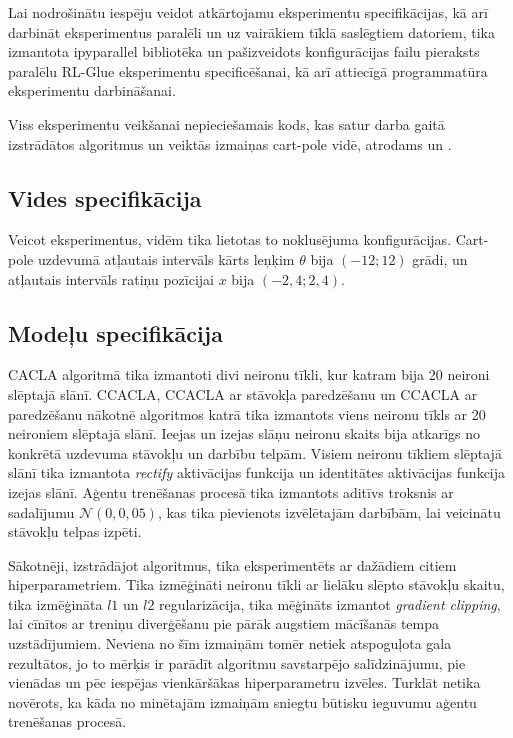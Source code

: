 \documentclass{ludis} %
\begin{document}
Lai nodrošinātu iespēju veidot atkārtojamu eksperimentu specifikācijas, kā arī
darbināt eksperimentus paralēli un uz vairākiem tīklā saslēgtiem datoriem, tika
izmantota ipyparallel bibliotēka \autocite{ipyparallel} un pašizveidots
konfigurācijas failu pieraksts paralēlu RL-Glue eksperimentu specificēšanai, kā
arī attiecīgā programmatūra eksperimentu darbināšanai.

Viss eksperimentu veikšanai nepieciešamais kods, kas satur darba gaitā
izstrādātos algoritmus un veiktās izmaiņas cart-pole vidē, atrodams
\autocite{predictiverl} un \autocite{continuousenv}.

\subsection{Vides specifikācija}
Veicot eksperimentus, vidēm tika lietotas to noklusējuma konfigurācijas.
Cart-pole uzdevumā atļautais intervāls kārts leņķim $\theta$ bija $(-12; 12)$
grādi, un atļautais intervāls ratiņu pozīcijai $x$ bija $(-2,4; 2,4)$.


\subsection{Modeļu specifikācija}
CACLA algoritmā tika izmantoti divi neironu tīkli, kur katram bija 20
neironi slēptajā slānī. CCACLA, CCACLA ar stāvokļa paredzēšanu un CCACLA ar
paredzēšanu nākotnē algoritmos katrā tika izmantots viens neironu tīkls ar 20
neironiem slēptajā slānī. Ieejas un izejas slāņu neironu skaits bija atkarīgs no
konkrētā uzdevuma stāvokļu un darbību telpām. Visiem neironu tīkliem slēptajā
slānī tika izmantota \textit{rectify} aktivācijas funkcija un identitātes
aktivācijas funkcija izejas slānī. Aģentu trenēšanas procesā tika izmantots
aditīvs troksnis ar sadalījumu $\mathcal{N}(0, 0,05)$, kas tika pievienots
izvēlētajām darbībām, lai veicinātu stāvokļu telpas izpēti.

Sākotnēji, izstrādājot algoritmus, tika eksperimentēts ar dažādiem citiem
hiperparametriem. Tika izmēģināti neironu tīkli ar lielāku slēpto stāvokļu
skaitu, tika izmēģināta $l1$ un $l2$ regularizācija, tika mēģināts izmantot
\textit{gradient clipping}, lai cīnītos ar treniņu diverģēšanu pie pārāk
augstiem mācīšanās tempa uzstādījumiem. Neviena no šīm izmaiņām tomēr netiek
atspoguļota gala rezultātos, jo to mērķis ir parādīt algoritmu savstarpējo
salīdzinājumu, pie vienādas un pēc iespējas vienkāršākas hiperparametru izvēles.
Turklāt netika novērots, ka kāda no minētajām izmaiņām sniegtu būtisku ieguvumu
aģentu trenēšanas procesā.
\end{document}
